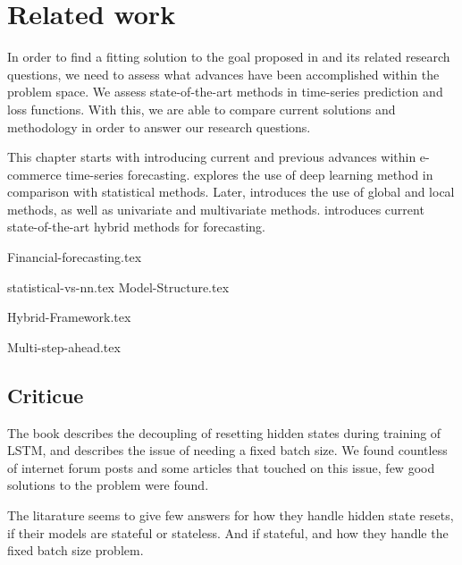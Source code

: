 \chapter{Related work}
\label{section:RelatedWork}

In order to find a fitting solution to the goal proposed in  and its related research questions,
we need to assess what advances have been accomplished within the problem space.
We assess state-of-the-art methods in time-series prediction and loss functions.
With this, we are able to compare current solutions and methodology in order to answer our research questions.

This chapter starts with  introducing current and previous advances within e-commerce time-series forecasting.
 explores the use of deep learning method in comparison with statistical methods.
Later,  introduces the use of global and local methods, as well as univariate and multivariate methods.
 introduces current state-of-the-art hybrid methods for forecasting.



{Financial-forecasting.tex}

{statistical-vs-nn.tex}
{Model-Structure.tex}

{Hybrid-Framework.tex}

{Multi-step-ahead.tex}

\section*{Criticue}
The book \cite{Bharadi2021} describes the decoupling of resetting hidden
states during training of LSTM, and describes the issue of
needing a fixed batch size. We found countless of internet forum posts
and some articles that touched on this issue, few good solutions
to the problem were found.

The litarature seems to give few answers for how they handle hidden state
resets, if their models are stateful or stateless. And if stateful,
and how they handle the fixed batch size problem.

